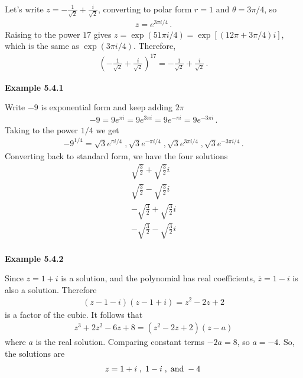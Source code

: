 Let's write $z=-\frac{1}{\sqrt{2}} + \frac{i}{\sqrt{2}}$, converting to polar form $r = 1$ and $\theta = 3\pi/4$, so
\begin{align*}
    z = e^{3\pi i/4} \, .
\end{align*}
Raising to the power $17$ gives $z = \exp(51\pi i/4) = \exp[(12\pi + 3\pi/4)i]$, which is the same as $\exp(3\pi i/4)$. Therefore,
\begin{align*}
\left(-\frac{1}{\sqrt{2}} + \frac{i}{\sqrt{2}}\right)^{17} = -\frac{1}{\sqrt{2}} + \frac{i}{\sqrt{2}} \, .
\end{align*}

\vspace{20mm}
\textbf{Example 5.4.1} \par

Write $-9$ is exponential form and keep adding $2\pi$
\begin{align*}
    -9 = 9e^{\pi i} = 9e^{3\pi i} = 9e^{-\pi i} = 9e^{-3\pi i} \,.
\end{align*}
Taking to the power $1/4$ we get
\begin{align*}
    -9^{1/4} = \sqrt{3} e^{\pi i/4} \; , \sqrt{3} e^{-\pi i/4} \; , \sqrt{3} e^{3\pi i/4} \; , \sqrt{3} e^{-3\pi i/4} \, .
\end{align*}
Converting back to standard form, we have the four solutions
\begin{align*}
    \sqrt{\frac{3}{2}} + \sqrt{\frac{3}{2}}i\\
    \sqrt{\frac{3}{2}} - \sqrt{\frac{3}{2}}i\\
    -\sqrt{\frac{3}{2}} + \sqrt{\frac{3}{2}}i\\
    -\sqrt{\frac{3}{2}} - \sqrt{\frac{3}{2}}i\\
\end{align*}

\vspace{10mm}
\textbf{Example 5.4.2} \par

Since $z=1+i$ is a solution, and the polynomial has real coefficients, $\bar{z}=1-i$ is also a solution. Therefore
\begin{align*}
    (z-1-i)(z-1+i) = z^2-2z+2
\end{align*}
is a factor of the cubic. It follows that
\begin{align*}
    z^3 + 2z^2 - 6z + 8 = (z^2-2z+2)(z-a)
\end{align*}
where $a$ is the real solution. Comparing constant terms $-2a = 8$, so $a=-4$. So, the solutions are
\begin{align*}
    z = 1+i \; , \; 1-i \; , \; {\rm and} \; -4 \,
\end{align*}